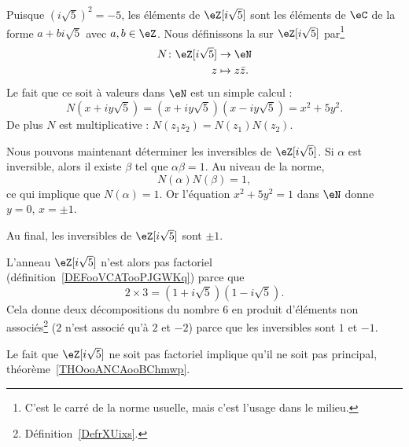 \begin{example}     \label{EXooYCTDooGXAjGC}
	Puisque \( (i\sqrt{ 5 })^2=-5\), les éléments de \( \eZ[i\sqrt{ 5 }]\) sont les éléments de \( \eC\) de la forme \( a+bi\sqrt{ 5 }\) avec \( a,b\in \eZ\). Nous définissons la  sur \( \eZ[i\sqrt{ 5 }]\) par\footnote{C'est le carré de la norme usuelle, mais c'est l'usage dans le milieu.}
	\begin{equation}
		\begin{aligned}
			N\colon \eZ[i\sqrt{ 5 }] & \to \eN          \\
			z                        & \mapsto z\bar z.
		\end{aligned}
	\end{equation}
	Le fait que ce soit à valeurs dans \( \eN\) est un simple calcul :
	\begin{equation}
		N(x+iy\sqrt{ 5 })=(x+iy\sqrt{ 5 })(x-iy\sqrt{ 5 })=x^2+5y^2.
	\end{equation}
	De plus \( N\) est multiplicative : \( N(z_1z_2)=N(z_1)N(z_2)\).

	Nous pouvons maintenant déterminer les inversibles de \( \eZ[i\sqrt{ 5 }]\). Si \( \alpha\) est inversible, alors il existe \( \beta\) tel que \( \alpha\beta=1\). Au niveau de la norme,
	\begin{equation}
		N(\alpha)N(\beta)=1,
	\end{equation}
	ce qui implique que \( N(\alpha)=1\). Or l'équation \( x^2+5y^2=1\) dans \( \eN\) donne \( y=0\), \( x=\pm 1\).

	Au final, les inversibles de \( \eZ[i\sqrt{ 5 }]\) sont \( \pm 1\).

	L'anneau \( \eZ[i\sqrt{ 5 }]\) n'est alors pas factoriel (définition~\ref{DEFooVCATooPJGWKq}) parce que
	\begin{equation}
		2\times 3=(1+i\sqrt{ 5 })(1-i\sqrt{ 5 }).
	\end{equation}
	Cela donne deux décompositions du nombre \( 6\) en produit d'éléments non associés\footnote{Définition~\ref{DefrXUixs}.} (\( 2\) n'est associé qu'à \( 2\) et \( -2\)) parce que les inversibles sont \( 1\) et \( -1\).

	Le fait que \( \eZ[i\sqrt{ 5 }]\) ne soit pas factoriel implique qu'il ne soit pas principal, théorème~\ref{THOooANCAooBChmwp}.
\end{example}

